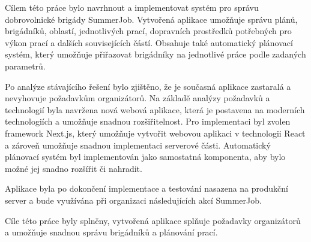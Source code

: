 \begin{conclusion}
	Cílem této práce bylo navrhnout a implementovat systém pro správu dobrovolnické brigády SummerJob.
	Vytvořená aplikace umožňuje správu plánů, brigádníků, oblastí, jednotlivých prací, dopravních prostředků potřebných pro výkon prací a dalších souvisejících částí.
	Obsahuje také automatický plánovací systém, který umožňuje přiřazovat brigádníky na jednotlivé práce podle zadaných parametrů.

	Po analýze stávajícího řešení bylo zjištěno, že je současná aplikace zastaralá a nevyhovuje požadavkům organizátorů.
	Na základě analýzy požadavků a technologií byla navržena nová webová aplikace, která je postavena na moderních technologiích a umožňuje snadnou rozšiřitelnost.
	Pro implementaci byl zvolen framework Next.js, který umožňuje vytvořit webovou aplikaci v technologii React a zároveň umožňuje snadnou implementaci serverové části.
	Automatický plánovací systém byl implementován jako samostatná komponenta, aby bylo možné jej snadno rozšířit či nahradit.

	Aplikace byla po dokončení implementace a testování nasazena na produkční server a bude využívána při organizaci následujících akcí SummerJob.

	Cíle této práce byly splněny, vytvořená aplikace splňuje požadavky organizátorů a umožňuje snadnou správu brigádníků a plánování prací.

\end{conclusion}
